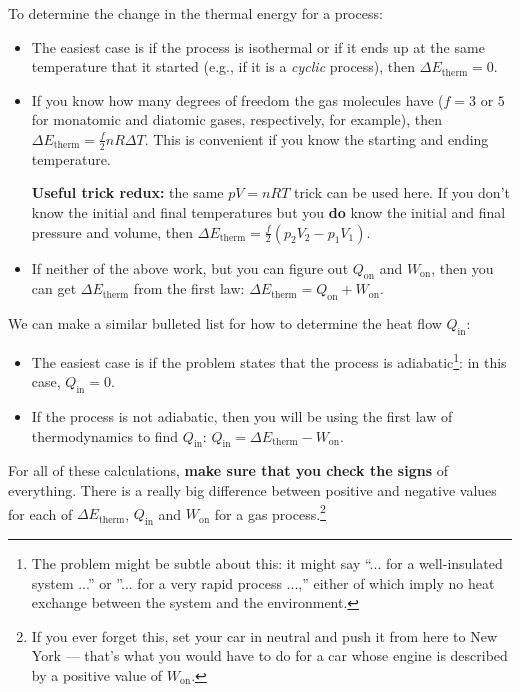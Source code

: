 To determine the change in the thermal energy for a process:
\begin{itemize}
\item The easiest case is if the process is isothermal or if it
ends up at the same temperature that it started (e.g., if it is a
{\em cyclic} process), then $\Delta E_\text{therm} = 0$. 
\item If you know how many degrees of freedom the gas molecules
have ($f = 3$ or $5$ for monatomic and diatomic gases, respectively,
for example), then $\Delta E_\text{therm} = \frac{f}{2}nR\Delta T$.
This is convenient if you know the starting and ending temperature.

{\bf Useful trick redux:} the same $pV = nRT$ trick can be used here.
If you don't know the initial and final temperatures but you {\bf do} 
know the initial and
final pressure and volume, then $\Delta E_\text{therm} = \frac{f}{2}(p_2V_2
- p_1V_1)$.

\item If neither of the above work, but you can figure out $Q_\text{on}$ and
$W_\text{on}$, then you can get $\Delta E_\text{therm}$ from the first law:  
$\Delta E_\text{therm} = Q_\text{on} + W_\text{on}$.
\end{itemize}

We can make a similar bulleted list for how to determine the heat 
flow $Q_\text{in}$:
\begin{itemize}

\item The easiest case is if the problem states that the process is
adiabatic\footnote{The problem might be subtle about this: it might
say ``... for a well-insulated system ...'' or ''... for a very
rapid process ...,'' either of which imply no heat exchange between
the system and the environment.}: in this case, $Q_\text{in} = 0$.

\item If the process is not adiabatic, then you will be using the first
law of thermodynamics to find $Q_\text{in}$: $Q_\text{in} = \Delta E_\text{therm} - W_\text{on}$.

\end{itemize}

For all of these calculations, {\bf make sure that you check the signs}
of everything.  There is a really big difference between positive and 
negative values for each of $\Delta E_\text{therm}$, $Q_\text{in}$ and
$W_\text{on}$ for a gas process.\footnote{If you ever forget this, set
your car in neutral and push it from here to New York --- that's what
you would have to do for a car whose engine is described by a positive
value of $W_\text{on}$.}


